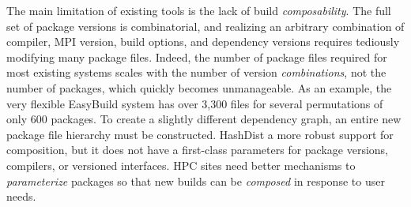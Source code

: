 
The main limitation of existing tools is the lack of build {\it composability}.
The full set of package versions is combinatorial, and realizing an arbitrary
combination of compiler, MPI version, build options, and dependency versions
requires tediously modifying many package files.
Indeed, the number of package files required for most existing systems scales
with the number of version {\it combinations}, not the number of packages, which
quickly becomes unmanageable.  As an example, the very flexible EasyBuild
system has over 3,300 files for several permutations of only 600 packages.
To create a slightly different dependency graph, an entire new package file
hierarchy must be constructed.  HashDist a more robust support for composition,
but it does not have a first-class parameters for package versions, compilers,
or versioned interfaces.
%
HPC sites need better mechanisms to {\it parameterize} packages so that new
builds can be {\it composed} in response to user needs.
%











